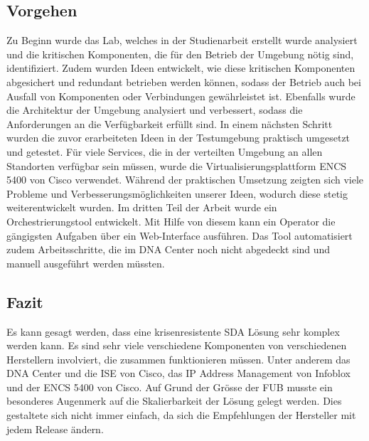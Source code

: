 \subsection{Vorgehen}
Zu Beginn wurde das Lab, welches in der Studienarbeit erstellt wurde analysiert und die kritischen Komponenten, die für den Betrieb der Umgebung nötig sind, identifiziert. Zudem wurden Ideen entwickelt, wie diese kritischen Komponenten abgesichert und redundant betrieben werden können, sodass der Betrieb auch bei Ausfall von Komponenten oder Verbindungen gewährleistet ist. Ebenfalls wurde die Architektur der Umgebung analysiert und verbessert, sodass die Anforderungen an die Verfügbarkeit erfüllt sind. In einem nächsten Schritt wurden die zuvor erarbeiteten Ideen in der Testumgebung praktisch umgesetzt und getestet. Für viele Services, die in der verteilten Umgebung an allen Standorten verfügbar sein müssen, wurde die Virtualisierungsplattform ENCS 5400 von Cisco verwendet. Während der praktischen Umsetzung zeigten sich viele Probleme und Verbesserungsmöglichkeiten unserer Ideen, wodurch diese stetig weiterentwickelt wurden. Im dritten Teil der Arbeit wurde ein Orchestrierungstool entwickelt. Mit Hilfe von diesem kann ein Operator die gängigsten Aufgaben über ein Web-Interface ausführen. Das Tool automatisiert zudem Arbeitsschritte, die im DNA Center noch nicht abgedeckt sind und manuell ausgeführt werden müssten.

\subsection{Fazit}
Es kann gesagt werden, dass eine krisenresistente SDA Lösung sehr komplex werden kann. Es sind sehr viele verschiedene Komponenten von verschiedenen Herstellern involviert, die zusammen funktionieren müssen. Unter anderem das DNA Center und die ISE von Cisco, das IP Address Management von Infoblox und der ENCS 5400 von Cisco. Auf Grund der Grösse der FUB musste ein besonderes Augenmerk auf die Skalierbarkeit der Lösung gelegt werden. Dies gestaltete sich nicht immer einfach, da sich die Empfehlungen der Hersteller mit jedem Release ändern.